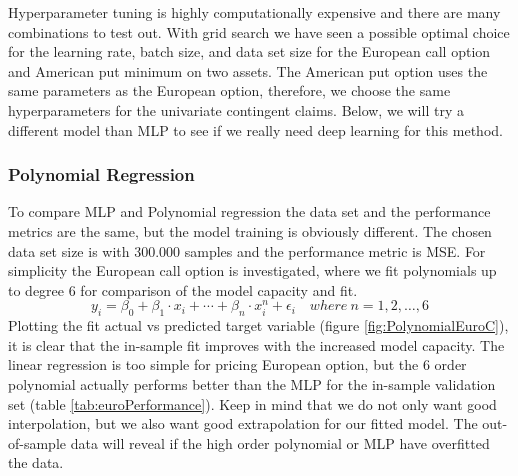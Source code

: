 Hyperparameter tuning is highly computationally expensive and there are many combinations to test out. With grid search we have seen a possible optimal choice for the learning rate, batch size, and data set size for the European call option and American put minimum on two assets. The American put option uses the same parameters as the European option, therefore,  we choose the same hyperparameters for the univariate contingent claims. Below, we will try a different model than MLP to see if we really need deep learning for this method. 

\subsubsection{Polynomial Regression}
To compare MLP and Polynomial regression the data set and the performance metrics are the same, but the model training is obviously different. The chosen data set size is with 300.000 samples and the performance metric is MSE. For simplicity the European call option is investigated, where we fit polynomials up to degree 6 for comparison of the model capacity and fit.  
$$y_i=\beta_0 + \beta_1 \cdot x_i + \cdots + \beta_n \cdot x_i^n + \epsilon_i \quad where \ n=1,2,\ldots,6$$
Plotting the fit actual vs predicted target variable (figure \ref{fig:PolynomialEuroC}), it is clear that the in-sample fit improves with the increased model capacity. The linear regression is too simple for pricing European option, but the 6 order polynomial actually performs better than the MLP for the in-sample validation set (table \ref{tab:euroPerformance}). Keep in mind that we do not only want good interpolation, but we also want good extrapolation for our fitted model. The out-of-sample data will reveal if the high order polynomial or MLP have overfitted the data.\\

